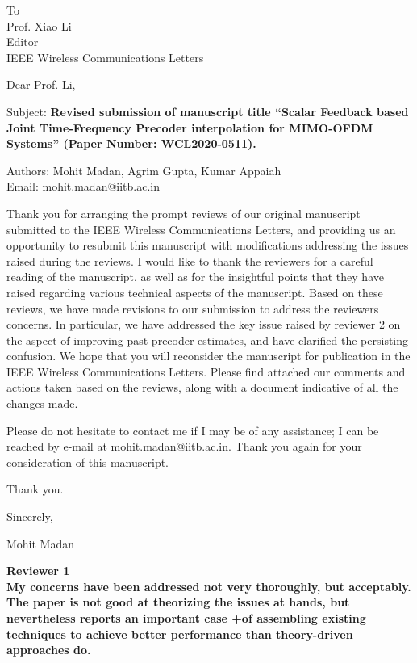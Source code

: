 \documentclass[12pt]{letter}
\date{\today}
\begin{document}
\begin{letter}{To\\
Prof. Xiao Li\\
Editor\\
IEEE Wireless Communications Letters}
\vspace{0.5in}


\opening{Dear Prof. Li,}

Subject: \textbf{Revised submission of manuscript title ``Scalar
  Feedback based Joint Time-Frequency Precoder interpolation for  MIMO-OFDM Systems'' (Paper Number: WCL2020-0511).}

Authors: Mohit Madan, Agrim Gupta, Kumar Appaiah\\
Email: mohit.madan@iitb.ac.in

Thank you for arranging the prompt reviews of our original manuscript
submitted to the IEEE Wireless Communications Letters, and providing
us an opportunity to resubmit this manuscript with modifications
addressing the issues raised during the reviews. I would like to thank
the reviewers for a careful reading of the manuscript, as well as for
the insightful points that they have raised regarding various
technical aspects of the manuscript. Based on these reviews, we have
made revisions to our submission to address the reviewers concerns. In
particular, we have addressed the key issue raised by reviewer 2 on
the aspect of improving past precoder estimates, and have clarified
the persisting confusion. We hope that you will reconsider the
manuscript for publication in the IEEE Wireless Communications
Letters. Please find attached our comments and actions taken based on
the reviews, along with a document indicative of all the changes made.

Please do not hesitate to contact me if I may be of any assistance; I
can be reached by e-mail at mohit.madan@iitb.ac.in. Thank you again
for your consideration of this manuscript.


Thank you.
\vspace{0.3in}

Sincerely,

Mohit Madan



\end{letter}

\newpage


\textbf{Reviewer 1}\\

\textbf{My concerns have been addressed not very thoroughly, but
  acceptably. The paper is not good at theorizing the issues at hands,
  but nevertheless reports an important case
+of assembling existing techniques to achieve better performance than
theory-driven approaches do.
}
\end{document}
